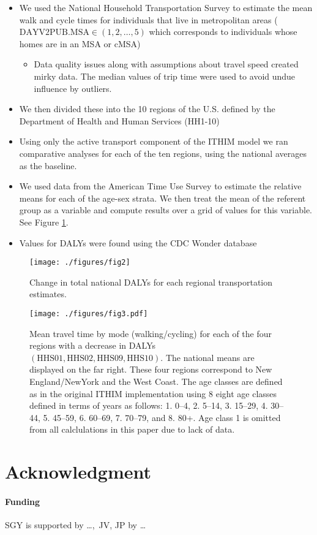 \documentclass{bioinfo}
\newcommand{\bi}{\begin{itemize}}
\newcommand{\ei}{\end{itemize}}
\begin{document}
\begin{itemize}
\item We used the National Household Transportation Survey \cite{NHTS} to
  estimate the mean walk and cycle times for individuals that live in
  metropolitan areas ($\textrm{DAYV2PUB.MSA} \in (1,2,\ldots,5)$ which
  corresponds to individuals whose homes are in an MSA or cMSA)
  \bi\item Data quality issues along with assumptions about travel speed
created mirky data.  The median values of trip time were used to avoid
undue influence by outliers.\ei
\item We then divided these into the 10 regions of the U.S. defined by
  the Department of Health and Human Services (HH1-10)
\item Using only the active transport component of the ITHIM model we
  ran comparative analyses for each of the ten regions, using the
  national averages as the baseline.
\item We used data from the American Time Use Survey \cite{ATUS} to
  estimate the relative means for each of the age-sex strata.  We then
  treat the mean of the referent group as a variable and compute
  results over a grid of values for this variable.  See Figure
  \ref{dalyFigure}.
\item Values for DALYs were found using the CDC Wonder database \cite{CDCWonder}
\end{itemize}

\begin{figure}[t]
    \centerline{\texttt{[image: ./figures/fig2]}}
    \caption{Change in total national DALYs for each regional
      transportation estimates.}\label{dalyFigure}
\end{figure}

\begin{figure}[t]
  \centerline{\texttt{[image: ./figures/fig3.pdf]}}
    \caption{Mean travel time by mode (walking/cycling) for each of
      the four regions with a decrease in DALYs
      $(\textrm{HHS01},\textrm{HHS02},\textrm{HHS09},\textrm{HHS10})$. The
      national means are displayed on the far right.  These four
      regions correspond to New England/NewYork and the West
      Coast. The age classes are defined as in the original ITHIM
      implementation using 8 eight age classes defined in terms of
      years as follows: 1. 0--4, 2. 5--14, 3. 15--29, 4. 30--44,
      5. 45--59, 6. 60--69, 7. 70--79, and 8. 80+. Age class 1 is
      omitted from all calclulations in this paper due to lack of
      data.}\label{meanMatrices}
\end{figure}

\section*{Acknowledgment}
\paragraph{Funding\textcolon} SGY is supported by \ldots,\ JV, JP by \ldots

%
%


\end{document}
